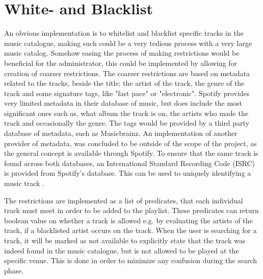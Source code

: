 \section{White- and Blacklist}

An obvious implementation is to whitelist and blacklist specific tracks in the music catalogue, making such could be a very tedious process with a very large music catalog. Somehow easing the process of making restrictions would be beneficial for the administrator, this could be implemented by allowing for creation of coarser restrictions. The coarser restrictions are based on metadata related to the tracks, beside the title; the artist of the track, the genre of the track and some signature tags, like "fast pace" or "electronic". Spotify provides very limited metadata in their database of music, but does include the most significant ones such as, what album the track is on, the artists who made the track and occasionally the genre. The tags would be provided by a third party database of metadata, such as Musicbrainz. An implementation of another provider of metadata, was concluded to be outside of the scope of the project, as the general concept is available through Spotify. To ensure that the same track is found across both databases, an International Standard Recording Code (ISRC) is provided from Spotify’s database. This can be used to uniquely identifying a music track \cite{isrc}.

The restrictions are implemented as a list of predicates, that each individual track must meet in order to be added to the playlist. These predicates can return boolean value on whether a track is allowed e.g. by evaluating the artists of the track, if a blacklisted artist occurs on the track. When the user is searching for a track, it will be marked as not available to explicitly state that the track was indeed found in the music catalogue, but is not allowed to be played at the specific venue. This is done in order to minimize any confusion during the search phase.
